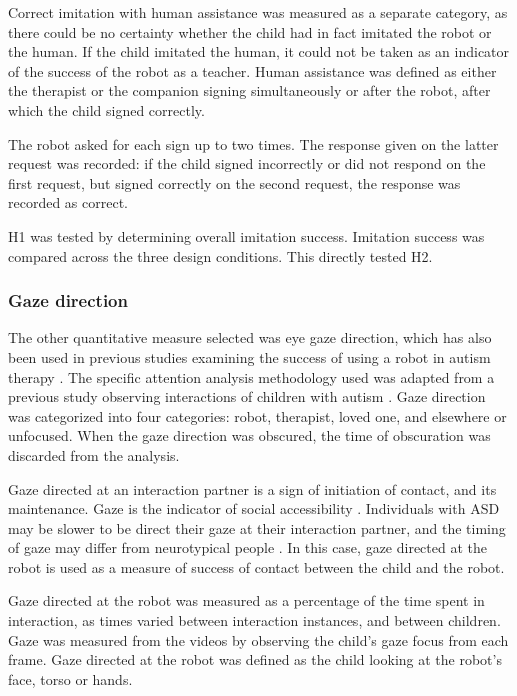 Correct imitation with human assistance was measured as a separate category, as there could be no certainty whether the child had in fact imitated the robot or the human. If the child imitated the human, it could not be taken as an indicator of the success of the robot as a teacher. Human assistance was defined as either the therapist or the companion signing simultaneously or after the robot, after which the child signed correctly.

The robot asked for each sign up to two times. The response given on the latter request was recorded: if the child signed incorrectly or did not respond on the first request, but signed correctly on the second request, the response was recorded as correct.

H1 was tested by determining overall imitation success. Imitation success was compared across the three design conditions. This directly tested H2. 


\subsubsection{Gaze direction}

The other quantitative measure selected was eye gaze direction, which has also been used in previous studies examining the success of using a robot in autism therapy \cite{ARIA, duquette2008exploring, goodrich2012incorporating, kozima2009keepon, pop2013social, robins2004effects, wainer2014pilot}. The specific attention analysis methodology used was adapted from a previous study observing interactions of children with autism \cite{joseph1997investigation}. Gaze direction was categorized into four categories: robot, therapist, loved one, and elsewhere or unfocused. When the gaze direction was obscured, the time of obscuration was discarded from the analysis.

Gaze directed at an interaction partner is a sign of initiation of contact, and its maintenance. Gaze is the indicator of social accessibility \cite{goffman2017interaction}. Individuals with ASD may be slower to be direct their gaze at their interaction partner, and the timing of gaze may differ from neurotypical people \cite{kendon1967some}. In this case, gaze directed at the robot is used as a measure of success of contact between the child and the robot.

Gaze directed at the robot was measured as a percentage of the time spent in interaction, as times varied between interaction instances, and between children. Gaze was measured from the videos by observing the child's gaze focus from each frame. Gaze directed at the robot was defined as the child looking at the robot's face, torso or hands.

